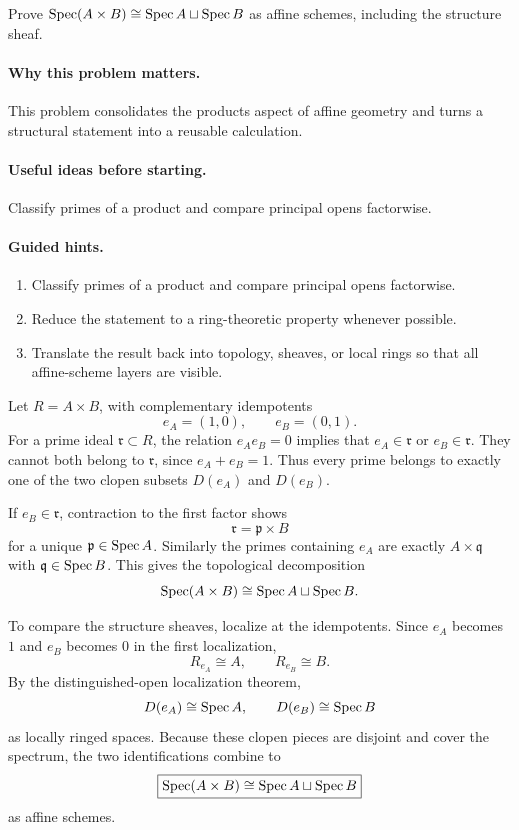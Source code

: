 \begin{problem}\label{prob:vi18-p07}
Prove $\operatorname{Spec}(A\times B)\cong\operatorname{Spec} A\sqcup\operatorname{Spec} B$ as affine schemes, including the structure sheaf.
\end{problem}

\ifdefined\FullProblemDossiers
\paragraph{Why this problem matters.}
This problem consolidates the products aspect of affine geometry and turns a structural statement into a reusable calculation.

\paragraph{Useful ideas before starting.}
Classify primes of a product and compare principal opens factorwise.

\paragraph{Guided hints.}
\begin{enumerate}
\item Classify primes of a product and compare principal opens factorwise.
\item Reduce the statement to a ring-theoretic property whenever possible.
\item Translate the result back into topology, sheaves, or local rings so that all affine-scheme layers are visible.
\end{enumerate}

\begin{solution}
Let $R=A\times B$, with complementary idempotents
\[
e_A=(1,0),\qquad e_B=(0,1).
\]
For a prime ideal $\mathfrak r\subset R$, the relation $e_Ae_B=0$ implies that $e_A\in\mathfrak r$ or $e_B\in\mathfrak r$. They cannot both belong to $\mathfrak r$, since $e_A+e_B=1$. Thus every prime belongs to exactly one of the two clopen subsets $D(e_A)$ and $D(e_B)$.

If $e_B\in\mathfrak r$, contraction to the first factor shows
\[
\mathfrak r=\mathfrak p\times B
\]
for a unique $\mathfrak p\in\operatorname{Spec} A$. Similarly the primes containing $e_A$ are exactly $A\times\mathfrak q$ with $\mathfrak q\in\operatorname{Spec} B$. This gives the topological decomposition
\[
\operatorname{Spec}(A\times B)\cong\operatorname{Spec} A\sqcup\operatorname{Spec} B.
\]

To compare the structure sheaves, localize at the idempotents. Since $e_A$ becomes $1$ and $e_B$ becomes $0$ in the first localization,
\[
R_{e_A}\cong A,
\qquad
R_{e_B}\cong B.
\]
By the distinguished-open localization theorem,
\[
D(e_A)\cong\operatorname{Spec} A,
\qquad
D(e_B)\cong\operatorname{Spec} B
\]
as locally ringed spaces. Because these clopen pieces are disjoint and cover the spectrum, the two identifications combine to
\[
\boxed{\operatorname{Spec}(A\times B)\cong\operatorname{Spec} A\sqcup\operatorname{Spec} B}
\]
as affine schemes.
\end{solution}


